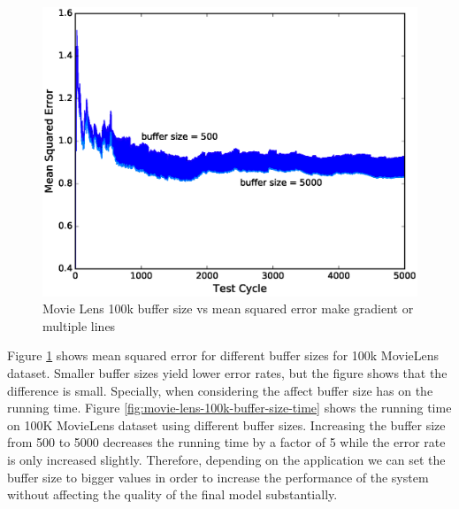 \documentclass{sig-alternate-05-2015}
\begin{document}
\begin{figure}[H]
\centering
\includegraphics[width=\columnwidth]{../images/experiment-results/movie-lens-100k-buffer-size.eps}
\caption{Movie Lens 100k buffer size vs mean squared error{\color{red} make gradient or multiple lines}}
\label{fig:movie-lens-100k-buffer-size-mse}
\end{figure}

Figure \ref{fig:movie-lens-100k-buffer-size-mse} shows mean squared error for different buffer sizes for 100k MovieLens dataset. 
Smaller buffer sizes yield lower error rates, but the figure shows that the difference is small.
Specially, when considering the affect buffer size has on the running time.
Figure \ref{fig:movie-lens-100k-buffer-size-time} shows the running time on 100K MovieLens dataset using different buffer sizes. 
Increasing the buffer size from 500 to 5000 decreases the running time by a factor of 5 while the error rate is only increased slightly.
Therefore, depending on the application we can set the buffer size to bigger values in order to increase the performance of the system without affecting the quality of the final model substantially.
\end{document}
